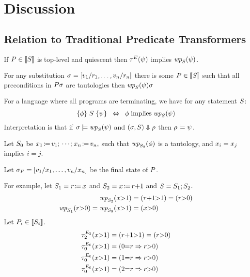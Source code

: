 \section{Discussion}

\subsection{Relation to Traditional Predicate Transformers}

\begin{proposition}
  If $P\in\llbracket S\rrbracket$ is top-level and quiescent then 
  $\aTr{\aEvs}{\bForm}$ implies $\fwp{\aCmd}{\bForm}$.

  For any substitution $\sigma=[{v_1/r_1},\ldots, {v_n/r_n}]$ there is some
  $P\in\llbracket S\rrbracket$ %
  such that all preconditions in $P\sigma$ are tautologies then 
  $\fwp{\aCmd}{\bForm}\aSub$
\end{proposition}

For a language where all programs are
terminating, we have for any statement $S$:
\begin{align*}
  \hoare{\aForm}{\aCmd}{\bForm} 
  \;\;\Leftrightarrow\;\;
  \aForm \textimplies \fwp{\aCmd}{\bForm}
\end{align*}
Interpretation is that if $\aState\models\fwp{\aCmd}{\bForm}$ and
$(\sigma,S)\Downarrow\rho$
then $\rho\models\psi$.

Let $S_0$ be
\begin{math}
  \PW{\aLoc_1}{\aVal_1}\SEMI\cdots\SEMI \PW{\aLoc_n}{\aVal_n}, 
\end{math}
such that $\fwp{\aCmd_0}{\aForm}$ is a tautology, and $x_i=x_j$
implies $i=j$.

Let $\sigma_P=[{v_1/x_1},\ldots, {v_n/x_n}]$ be the final
state of $P$.


For example, let $\aCmd_1=\PR{x}{r}$ and $\aCmd_2=\PW{x}{r{+}1}$ and
$S=S_1\mathtt{;}\,\allowbreak S_2$.
\begin{align*}
  \fwp{\aCmd_2}{x{>}1}&=(r{+}1{>}1) = (r{>}0)
  \\
  \fwp{\aCmd_1}{r{>}0}=\fwp{\aCmd_0}{x{>}1}&=(x{>}0)
\end{align*}
Let $P_i\in\llbracket S_i\rrbracket$.
\begin{align*}
  \aTr[2]{\aEvs_2}{x{>}1}&=(r{+}1{>}1) = (r{>}0)
  \\
  \aTr[0]{\aEvs_0}{x{>}1}&=(0{=}\aReg \limplies r{>}0)
  \\
  \aTr[0]{\aEvs_0}{x{>}1}&=(1{=}\aReg \limplies r{>}0)
  \\
  \aTr[0]{\aEvs_0}{x{>}1}&=(2{=}\aReg \limplies r{>}0)
\end{align*}

